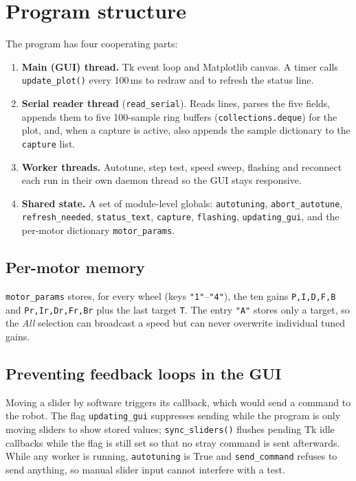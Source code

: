 \documentclass[11pt,a4paper]{report}
\newcommand{\code}[1]{\texttt{#1}}
\begin{document}
\section{Program structure}
The program has four cooperating parts:
\begin{enumerate}[noitemsep]
  \item \textbf{Main (GUI) thread.} Tk event loop and Matplotlib canvas. A timer calls \code{update\_plot()} every 100\,ms to redraw and to refresh the status line.
  \item \textbf{Serial reader thread} (\code{read\_serial}). Reads lines, parses the five fields, appends them to five 100-sample ring buffers (\code{collections.deque}) for the plot, and, when a capture is active, also appends the sample dictionary to the \code{capture} list.
  \item \textbf{Worker threads.} Autotune, step test, speed sweep, flashing and reconnect each run in their own daemon thread so the GUI stays responsive.
  \item \textbf{Shared state.} A set of module-level globals: \code{autotuning}, \code{abort\_autotune}, \code{refresh\_needed}, \code{status\_text}, \code{capture}, \code{flashing}, \code{updating\_gui}, and the per-motor dictionary \code{motor\_params}.
\end{enumerate}

\subsection{Per-motor memory}
\code{motor\_params} stores, for every wheel (keys \code{"1"}--\code{"4"}), the ten gains \code{P,I,D,F,B} and \code{Pr,Ir,Dr,Fr,Br} plus the last target \code{T}. The entry \code{"A"} stores only a target, so the \emph{All} selection can broadcast a speed but can never overwrite individual tuned gains.

\subsection{Preventing feedback loops in the GUI}
Moving a slider by software triggers its callback, which would send a command to the robot. The flag \code{updating\_gui} suppresses sending while the program is only moving sliders to show stored values; \code{sync\_sliders()} flushes pending Tk idle callbacks while the flag is still set so that no stray command is sent afterwards. While any worker is running, \code{autotuning} is True and \code{send\_command} refuses to send anything, so manual slider input cannot interfere with a test.
\end{document}
